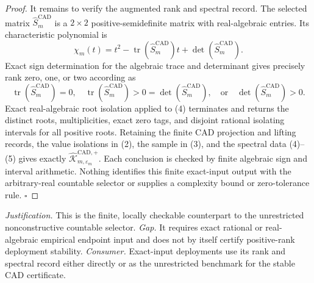 \documentclass{article}
\begin{document}
\begin{proof}
It remains to verify the augmented rank and spectral record.  The selected matrix \(\widehat S_m^{\mathrm{CAD}}\) is a \(2\times2\) positive-semidefinite matrix with real-algebraic entries.  Its characteristic polynomial is
\[
\chi_m(t)=t^2-\operatorname{tr}(\widehat S_m^{\mathrm{CAD}})t
+\det(\widehat S_m^{\mathrm{CAD}}).
\tag{4}
\]
Exact sign determination for the algebraic trace and determinant gives precisely rank zero, one, or two according as
\[
\operatorname{tr}(\widehat S_m^{\mathrm{CAD}})=0,
\quad
\operatorname{tr}(\widehat S_m^{\mathrm{CAD}})>0=\det(\widehat S_m^{\mathrm{CAD}}),
\quad\text{or}\quad
\det(\widehat S_m^{\mathrm{CAD}})>0.
\tag{5}
\]
Exact real-algebraic root isolation applied to (4) terminates and returns the distinct roots, multiplicities, exact zero tags, and disjoint rational isolating intervals for all positive roots.  Retaining the finite CAD projection and lifting records, the value isolations in (2), the sample in (3), and the spectral data (4)--(5) gives exactly \(\widehat{\mathscr K}_{m,\varepsilon_m}^{\mathrm{CAD},+}\).  Each conclusion is checked by finite algebraic sign and interval arithmetic.  Nothing identifies this finite exact-input output with the arbitrary-real countable selector or supplies a complexity bound or zero-tolerance rule. \(\square\)
\end{proof}
\par\smallskip\noindent \textit{Justification.} This is the finite, locally checkable counterpart to the unrestricted nonconstructive countable selector. \textit{Gap.} It requires exact rational or real-algebraic empirical endpoint input and does not by itself certify positive-rank deployment stability. \textit{Consumer.} Exact-input deployments use its rank and spectral record either directly or as the unrestricted benchmark for the stable CAD certificate.
\end{document}
